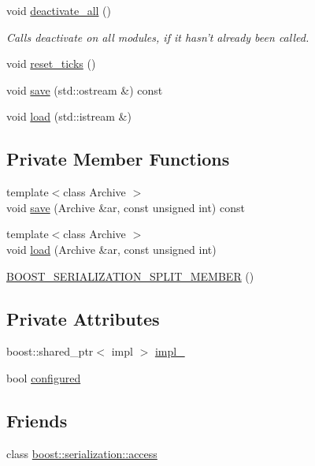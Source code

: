 \begin{DoxyCompactItemize}
void \hyperlink{structecto_1_1plasm_a6c10f2812f731c3787e5e22bdd80e9bc}{deactivate\-\_\-all} ()
\begin{DoxyCompactList}\small\item\em Calls deactivate on all modules, if it hasn't already been called. \end{DoxyCompactList}\item 
void \hyperlink{structecto_1_1plasm_a992f656fa931efc20d2cf1a97c963cec}{reset\-\_\-ticks} ()
\item 
void \hyperlink{structecto_1_1plasm_ab0fd6bec2e5d8943363fe5aa36c1d676}{save} (std\-::ostream \&) const 
\item 
void \hyperlink{structecto_1_1plasm_a854400c2f46f995731e058c72a547185}{load} (std\-::istream \&)
\end{DoxyCompactItemize}
\subsection*{Private Member Functions}
\begin{DoxyCompactItemize}
\item 
{\footnotesize template$<$class Archive $>$ }\\void \hyperlink{structecto_1_1plasm_a420eb464746042e8247a69828e6782af}{save} (Archive \&ar, const unsigned int) const 
\item 
{\footnotesize template$<$class Archive $>$ }\\void \hyperlink{structecto_1_1plasm_ae6540bca37d0980ec24b0b75061e124e}{load} (Archive \&ar, const unsigned int)
\item 
\hyperlink{structecto_1_1plasm_ac443cf0a58324a8003e1c9fd3b49b428}{B\-O\-O\-S\-T\-\_\-\-S\-E\-R\-I\-A\-L\-I\-Z\-A\-T\-I\-O\-N\-\_\-\-S\-P\-L\-I\-T\-\_\-\-M\-E\-M\-B\-E\-R} ()
\end{DoxyCompactItemize}
\subsection*{Private Attributes}
\begin{DoxyCompactItemize}
\item 
boost\-::shared\-\_\-ptr$<$ impl $>$ \hyperlink{structecto_1_1plasm_a4cfd41e9dc82039a75970755565b2513}{impl\-\_\-}
\item 
bool \hyperlink{structecto_1_1plasm_a8d074da8290587fab0ed04d5cfe3f6b1}{configured}
\end{DoxyCompactItemize}
\subsection*{Friends}
\begin{DoxyCompactItemize}
\item 
class \hyperlink{structecto_1_1plasm_ac98d07dd8f7b70e16ccb9a01abf56b9c}{boost\-::serialization\-::access}
\end{DoxyCompactItemize}


